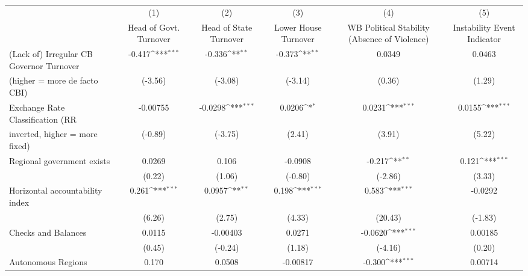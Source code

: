 {
\def\sym#1{\ifmmode^{#1}\else\(^{#1}\)\fi}
\begin{tabular}{l*{5}{c}}
\toprule
                                        &\multicolumn{1}{c}{(1)}&\multicolumn{1}{c}{(2)}&\multicolumn{1}{c}{(3)}&\multicolumn{1}{c}{(4)}&\multicolumn{1}{c}{(5)}\\
                                        &\multicolumn{1}{c}{Head of Govt. Turnover}&\multicolumn{1}{c}{Head of State Turnover}&\multicolumn{1}{c}{Lower House Turnover}&\multicolumn{1}{c}{WB Political Stability (Absence of Violence)}&\multicolumn{1}{c}{Instability Event Indicator}\\
\midrule
(Lack of) Irregular CB Governor Turnover&    -0.417\sym{***}&    -0.336\sym{**} &    -0.373\sym{**} &    0.0349         &    0.0463         \\
(higher = more de facto CBI)            &   (-3.56)         &   (-3.08)         &   (-3.14)         &    (0.36)         &    (1.29)         \\
\addlinespace
Exchange Rate Classification (RR        &  -0.00755         &   -0.0298\sym{***}&    0.0206\sym{*}  &    0.0231\sym{***}&    0.0155\sym{***}\\
inverted, higher = more fixed)          &   (-0.89)         &   (-3.75)         &    (2.41)         &    (3.91)         &    (5.22)         \\
\addlinespace
Regional government exists              &    0.0269         &     0.106         &   -0.0908         &    -0.217\sym{**} &     0.121\sym{***}\\
                                        &    (0.22)         &    (1.06)         &   (-0.80)         &   (-2.86)         &    (3.33)         \\
\addlinespace
Horizontal accountability index         &     0.261\sym{***}&    0.0957\sym{**} &     0.198\sym{***}&     0.583\sym{***}&   -0.0292         \\
                                        &    (6.26)         &    (2.75)         &    (4.33)         &   (20.43)         &   (-1.83)         \\
\addlinespace
Checks and Balances                     &    0.0115         &  -0.00403         &    0.0271         &   -0.0620\sym{***}&   0.00185         \\
                                        &    (0.45)         &   (-0.24)         &    (1.18)         &   (-4.16)         &    (0.20)         \\
\addlinespace
Autonomous Regions                      &     0.170         &    0.0508         &  -0.00817         &    -0.300\sym{***}&   0.00714         \\

\end{tabular}}
